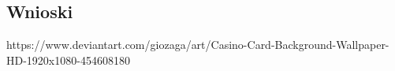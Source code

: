 \documentclass[a4paper,11pt,titlepage]{article}
\begin{document}
\subsection{Wnioski}


\newpage
{}
\listoffigures
\newpage

\begin{thebibliography}{9}
https://www.deviantart.com/giozaga/art/Casino-Card-Background-Wallpaper-HD-1920x1080-454608180



\end{thebibliography}
\end{document}
